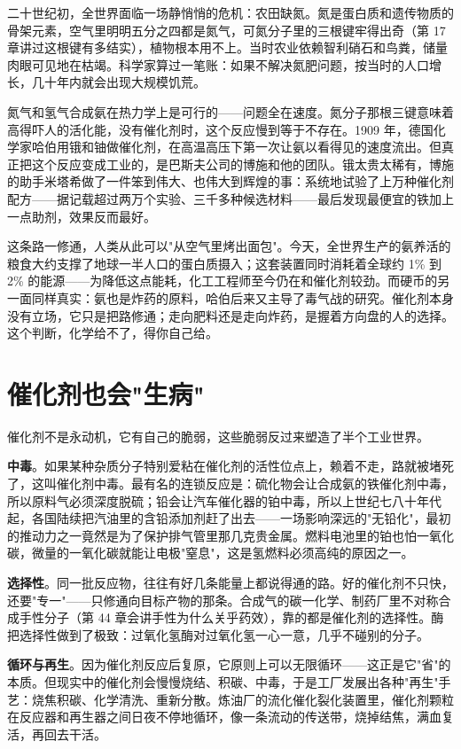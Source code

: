 \begin{zhengju}
二十世纪初，全世界面临一场静悄悄的危机：农田缺氮。氮是蛋白质和遗传物质的骨架元素，空气里明明五分之四都是氮气，可氮分子里的三根键牢得出奇（第 17 章讲过这根键有多结实），植物根本用不上。当时农业依赖智利硝石和鸟粪，储量肉眼可见地在枯竭。科学家算过一笔账：如果不解决氮肥问题，按当时的人口增长，几十年内就会出现大规模饥荒。

氮气和氢气合成氨在热力学上是可行的——问题全在速度。氮分子那根三键意味着高得吓人的活化能，没有催化剂时，这个反应慢到等于不存在。1909 年，德国化学家哈伯用锇和铀做催化剂，在高温高压下第一次让氨以看得见的速度流出。但真正把这个反应变成工业的，是巴斯夫公司的博施和他的团队。锇太贵太稀有，博施的助手米塔希做了一件笨到伟大、也伟大到辉煌的事：系统地试验了上万种催化剂配方——据记载超过两万个实验、三千多种候选材料——最后发现最便宜的铁加上一点助剂，效果反而最好。

这条路一修通，人类从此可以"从空气里烤出面包"。今天，全世界生产的氨养活的粮食大约支撑了地球一半人口的蛋白质摄入；这套装置同时消耗着全球约 1\% 到 2\% 的能源——为降低这点能耗，化工工程师至今仍在和催化剂较劲。而硬币的另一面同样真实：氨也是炸药的原料，哈伯后来又主导了毒气战的研究。催化剂本身没有立场，它只是把路修通；走向肥料还是走向炸药，是握着方向盘的人的选择。这个判断，化学给不了，得你自己给。
\end{zhengju}

\section{催化剂也会"生病"}

催化剂不是永动机，它有自己的脆弱，这些脆弱反过来塑造了半个工业世界。

\textbf{中毒}。如果某种杂质分子特别爱粘在催化剂的活性位点上，赖着不走，路就被堵死了，这叫催化剂中毒。最有名的连锁反应是：硫化物会让合成氨的铁催化剂中毒，所以原料气必须深度脱硫；铅会让汽车催化器的铂中毒，所以上世纪七八十年代起，各国陆续把汽油里的含铅添加剂赶了出去——一场影响深远的"无铅化"，最初的推动力之一竟然是为了保护排气管里那几克贵金属。燃料电池里的铂也怕一氧化碳，微量的一氧化碳就能让电极"窒息"，这是氢燃料必须高纯的原因之一。

\textbf{选择性}。同一批反应物，往往有好几条能量上都说得通的路。好的催化剂不只快，还要"专一"——只修通向目标产物的那条。合成气的碳一化学、制药厂里不对称合成手性分子（第 44 章会讲手性为什么关乎药效），靠的都是催化剂的选择性。酶把选择性做到了极致：过氧化氢酶对过氧化氢一心一意，几乎不碰别的分子。

\textbf{循环与再生}。因为催化剂反应后复原，它原则上可以无限循环——这正是它"省"的本质。但现实中的催化剂会慢慢烧结、积碳、中毒，于是工厂发展出各种"再生"手艺：烧焦积碳、化学清洗、重新分散。炼油厂的流化催化裂化装置里，催化剂颗粒在反应器和再生器之间日夜不停地循环，像一条流动的传送带，烧掉结焦，满血复活，再回去干活。


